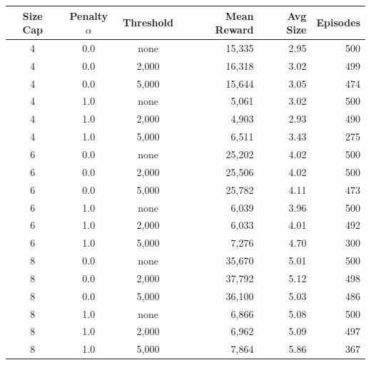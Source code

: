 \begin{tabular}{cccrrr}
\toprule
\textbf{Size Cap} & \textbf{Penalty $\alpha$} & \textbf{Threshold} & \textbf{Mean Reward} & \textbf{Avg Size} & \textbf{Episodes} \\
\midrule
4 & 0.0 & none  & 15{,}335 & 2.95 & 500 \\
4 & 0.0 & 2{,}000 & 16{,}318 & 3.02 & 499 \\
4 & 0.0 & 5{,}000 & 15{,}644 & 3.05 & 474 \\
4 & 1.0 & none  &  5{,}061 & 3.02 & 500 \\
4 & 1.0 & 2{,}000 &  4{,}903 & 2.93 & 490 \\
4 & 1.0 & 5{,}000 &  6{,}511 & 3.43 & 275 \\
\midrule
6 & 0.0 & none  & 25{,}202 & 4.02 & 500 \\
6 & 0.0 & 2{,}000 & 25{,}506 & 4.02 & 500 \\
6 & 0.0 & 5{,}000 & 25{,}782 & 4.11 & 473 \\
6 & 1.0 & none  &  6{,}039 & 3.96 & 500 \\
6 & 1.0 & 2{,}000 &  6{,}033 & 4.01 & 492 \\
6 & 1.0 & 5{,}000 &  7{,}276 & 4.70 & 300 \\
\midrule
8 & 0.0 & none  & 35{,}670 & 5.01 & 500 \\
8 & 0.0 & 2{,}000 & 37{,}792 & 5.12 & 498 \\
8 & 0.0 & 5{,}000 & 36{,}100 & 5.03 & 486 \\
8 & 1.0 & none  &  6{,}866 & 5.08 & 500 \\
8 & 1.0 & 2{,}000 &  6{,}962 & 5.09 & 497 \\
8 & 1.0 & 5{,}000 &  7{,}864 & 5.86 & 367 \\
\bottomrule
\end{tabular}
